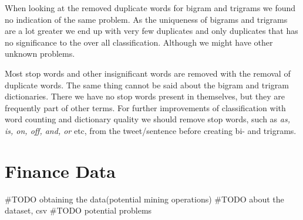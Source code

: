 When looking at the removed duplicate words for bigram and trigrams we found no
indication of the same problem. As the uniqueness of bigrams and trigrams are a
lot greater we end up with very few duplicates and only duplicates that has no
significance to the over all classification. Although we might have other
unknown problems.  

Most stop words and other insignificant words are removed with the removal of
duplicate words. The same thing cannot be said about the bigram and trigram
dictionaries. There we have no stop words present in themselves, but they are
frequently part of other terms. For further improvements of classification with
word counting and dictionary quality we should remove
stop words, such as \textit{as, is, on, off, and, or} etc, from the
tweet/sentence before creating bi- and trigrams.     
%

\section{Finance Data}\label{data:finance}
#TODO obtaining the data(potential mining operations)
#TODO about the dataset, csv
#TODO potential problems 
%

